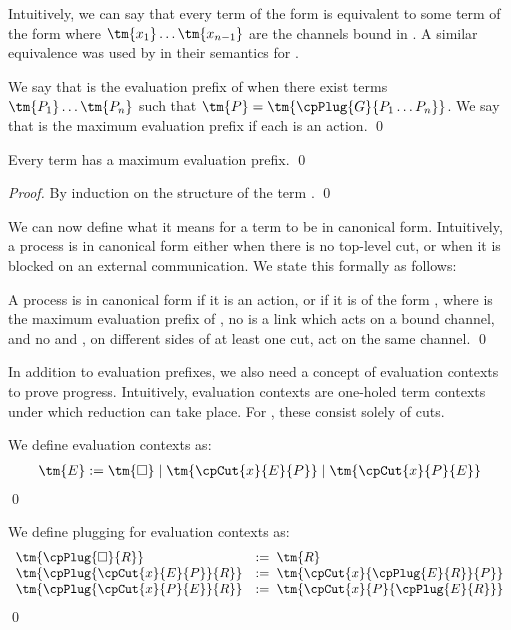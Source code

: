 \documentclass[UKenglish]{llncs}
\begin{document}
Intuitively, we can say that every term of the form
 is equivalent to some term of the form
where $\tm{x_1} \dots \tm{x_{n-1}}$ are the channels bound in .
A similar equivalence was used by  in their
semantics for \cp.
\begin{definition}\label{def:cp-maximum-evaluation-prefix}
  We say that  is the evaluation prefix of  when there exist terms
  $\tm{P_1} \dots \tm{P_n}$ such that $\tm{P} = \tm{\cpPlug{G}{P_1 \dots P_n}}$.
  We say that  is the maximum evaluation prefix if each  is an
  action. 
  \qed
\end{definition}
\begin{lemma}\label{thm:cp-maximum-evaluation-prefix}
  Every term  has a maximum evaluation prefix.
  \qed
\end{lemma}
\begin{proof}
  By induction on the structure of the term . 
  \qed
\end{proof}
We can now define what it means for a term to be in canonical form. Intuitively,
a process is in canonical form either when there is no top-level cut, or when it
is blocked on an external communication. We state this formally as follows:
\begin{definition}\label{def:cp-canonical-forms}
  A process  is in canonical form if it is an action, or if it is of the
  form , where  is the maximum evaluation
  prefix of , no  is a link which acts on a bound channel, and no
   and , on different sides of at least one cut, act on the same
  channel.
  \qed
\end{definition}
In addition to evaluation prefixes, we also need a concept of evaluation
contexts to prove progress. Intuitively, evaluation contexts are one-holed term
contexts under which reduction can take place. For \cp, these consist solely of
cuts.
\begin{definition}\label{def:cp-evaluation-contexts}
  We define evaluation contexts as:
  \begin{align*}
    \tm{E} := \tm{\Box}
    \mid \tm{\cpCut{x}{E}{P}}
    \mid \tm{\cpCut{x}{P}{E}}
  \end{align*}
  \qed
\end{definition}
\begin{definition}[Plugging]\label{def:cp-evaluation-context-plugging}
  We define plugging for evaluation contexts as:
  \begin{gather*}
    \begin{array}{ll}
      \tm{\cpPlug{\Box}{R}}            
      & := \; \tm{R}
      \\
      \tm{\cpPlug{\cpCut{x}{E}{P}}{R}}
      & := \; \tm{\cpCut{x}{\cpPlug{E}{R}}{P}}
      \\
      \tm{\cpPlug{\cpCut{x}{P}{E}}{R}}
      & := \; \tm{\cpCut{x}{P}{\cpPlug{E}{R}}}
    \end{array}
  \end{gather*}
  \qed
\end{definition}
\end{document}
